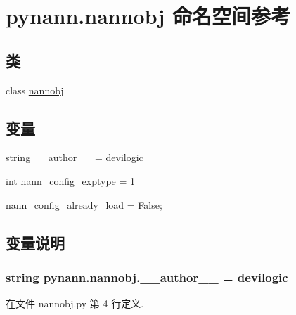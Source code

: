 \hypertarget{namespacepynann_1_1nannobj}{}\section{pynann.\+nannobj 命名空间参考}
\label{namespacepynann_1_1nannobj}
\subsection*{类}
\begin{DoxyCompactItemize}
\item 
class \hyperlink{classpynann_1_1nannobj_1_1nannobj}{nannobj}
\end{DoxyCompactItemize}
\subsection*{变量}
\begin{DoxyCompactItemize}
\item 
string \hyperlink{namespacepynann_1_1nannobj_a60a69ee36c7aefb2074e46206cd7a52d}{\+\_\+\+\_\+author\+\_\+\+\_\+} = \textquotesingle{}devilogic\textquotesingle{}
\item 
int \hyperlink{namespacepynann_1_1nannobj_a6a25a8097eab0c8ec490eb5f9b4674c9}{nann\+\_\+config\+\_\+exptype} = 1
\item 
\hyperlink{namespacepynann_1_1nannobj_a0db70474ff951be8c8dd2490ce99b79a}{nann\+\_\+config\+\_\+already\+\_\+load} = False;
\end{DoxyCompactItemize}


\subsection{变量说明}
\hypertarget{namespacepynann_1_1nannobj_a60a69ee36c7aefb2074e46206cd7a52d}{}
\subsubsection[{\+\_\+\+\_\+author\+\_\+\+\_\+}]{\setlength{\rightskip}{0pt plus 5cm}string pynann.\+nannobj.\+\_\+\+\_\+author\+\_\+\+\_\+ = \textquotesingle{}devilogic\textquotesingle{}}\label{namespacepynann_1_1nannobj_a60a69ee36c7aefb2074e46206cd7a52d}


在文件 nannobj.\+py 第 4 行定义.

